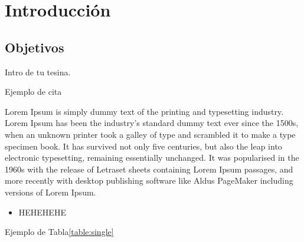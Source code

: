 \chapter{Introducción}\label{cap:intro}

\section{Objetivos}\label{cap:intro:sec:obj}

Intro de tu tesina.

Ejemplo de cita\cite{esp:blast2}

Lorem Ipsum is simply dummy text of the printing and typesetting industry.
Lorem Ipsum has been the industry's standard dummy text ever since the 1500s,
when an unknown printer took a galley of type and scrambled it to make a type
specimen book. It has survived not only five centuries, but also the leap into
electronic typesetting, remaining essentially unchanged. It was popularised in
the 1960s with the release of Letraset sheets containing Lorem Ipsum passages,
and more recently with desktop publishing software like Aldus PageMaker
including versions of Lorem Ipsum.

\begin{itemize}
	\item HEHEHEHE
\end{itemize}



Ejemplo de Tabla\ref{table:single}
